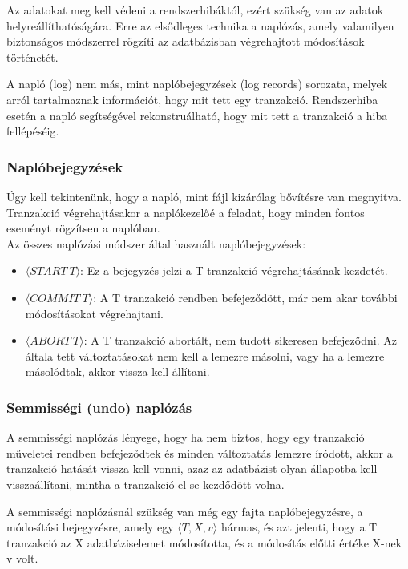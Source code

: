 \documentclass[margin=0px]{article}
\begin{document}
Az adatokat meg kell védeni a rendszerhibáktól, ezért szükség van az adatok helyreállíthatóságára. Erre az elsődleges
technika a naplózás, amely valamilyen biztonságos módszerrel rögzíti az adatbázisban végrehajtott módosítások történetét.

A napló (log) nem más, mint naplóbejegyzések (log records) sorozata, melyek arról tartalmaznak információt, hogy mit tett
egy tranzakció. Rendszerhiba esetén a napló segítségével rekonstruálható, hogy mit tett a tranzakció a hiba fellépéséig.

\subsubsection{Naplóbejegyzések}

Úgy kell tekintenünk, hogy a napló, mint fájl kizárólag bővítésre van megnyitva. Tranzakció végrehajtásakor a naplókezelőé
a feladat, hogy minden fontos eseményt rögzítsen a naplóban.\\

\noindent Az összes naplózási módszer által használt naplóbejegyzések:
\begin{itemize}
    \item	$\langle START \ T \rangle$: Ez a bejegyzés jelzi a T tranzakció végrehajtásának kezdetét.
    \item	$\langle COMMIT \ T \rangle$: A T tranzakció rendben befejeződött, már nem akar további módosításokat végrehajtani.
    \item	$\langle ABORT \ T \rangle$: A T tranzakció abortált, nem tudott sikeresen befejeződni. Az általa tett változtatásokat
          nem kell a lemezre másolni, vagy ha a lemezre másolódtak, akkor vissza kell állítani.
\end{itemize}

\subsubsection{Semmisségi (undo) naplózás}

A semmisségi naplózás lényege, hogy ha nem biztos, hogy egy tranzakció műveletei rendben befejeződtek és minden változtatás
lemezre íródott, akkor a tranzakció hatását vissza kell vonni, azaz az adatbázist olyan állapotba kell visszaállítani,
mintha a tranzakció el se kezdődött volna.

A semmisségi naplózásnál szükség van még egy fajta naplóbejegyzésre, a módosítási bejegyzésre, amely egy $\langle T,X,v\rangle$
hármas, és azt jelenti, hogy a T tranzakció az X adatbáziselemet módosította, és a módosítás előtti értéke X-nek v volt.\\
\end{document}
